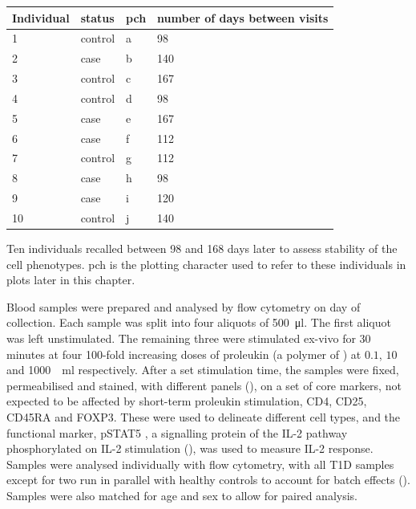 \begin{table}[ht]
\centering
\begin{tabular}{llll}
  \hline
Individual & status  & pch & number of days between visits \\
  \hline
1          & control & a   & 98 \\
2          & case    & b   & 140 \\
3          & control & c   & 167 \\
4          & control & d   & 98 \\
5          & case    & e   & 167 \\
6          & case    & f   & 112 \\
7          & control & g   & 112 \\
8          & case    & h   & 98 \\
9          & case    & i   & 120 \\
10         & control & j   & 140 \\
   \hline
\end{tabular}
{Ten individuals recalled between 98 and 168 days later to assess stability of the cell phenotypes. }
{
pch is the plotting character used to refer to these individuals in plots later in this chapter.
}
\end{table}
Blood samples were prepared and analysed by flow cytometry on day of collection.
Each sample was split into four aliquots of \SI{500}{\micro\litre}.
The first aliquot was left unstimulated.
The remaining three were stimulated ex-vivo for 30 minutes at four 100-fold increasing doses
of proleukin (a polymer of ) at $0.1$, $10$ and \SI{1000}{\unit\per\milli\litre} respectively.
After a set stimulation time, the samples were fixed, permeabilised and stained, with different panels (), 
on a set of core markers, not expected to be affected by short-term proleukin stimulation,
CD4, CD25, CD45RA and FOXP3.
These were used to delineate different cell types, and the functional marker, pSTAT5
, a signalling protein of the IL-2 pathway phosphorylated on IL-2 stimulation (),
was used to measure IL-2 response.
Samples were analysed individually with flow cytometry, with all \gls{T1D} samples except for two run in parallel with healthy controls
to account for batch effects ().
Samples were also matched for age and sex to allow for paired analysis.

